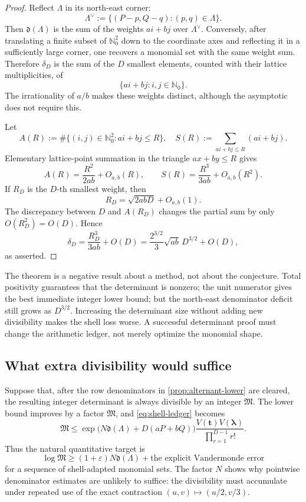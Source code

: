 \documentclass[10pt,oneside]{article}
\theoremstyle{definition}
\theoremstyle{remark}
\newcommand{\Nzero}{\mathbb N_0}
\begin{document}
\begin{proof}
Reflect \(\Lambda\) in its north-east corner:
\[
 \Lambda^\vee:=\{(P-p,Q-q):(p,q)\in\Lambda\}.
\]
Then \(\mathfrak d(\Lambda)\) is the sum of the weights \(ai+bj\) over \(\Lambda^\vee\).  Conversely, after translating a finite subset of \(\Nzero^2\) down to the coordinate axes and reflecting it in a sufficiently large corner, one recovers a monomial set with the same weight sum.  Therefore \(\delta_D\) is the sum of the \(D\) smallest elements, counted with their lattice multiplicities, of
\[
 \{ai+bj:i,j\in\Nzero\}.
\]
The irrationality of \(a/b\) makes these weights distinct, although the asymptotic does not require this.

Let
\[
 A(R):=\#\{(i,j)\in\Nzero^2:ai+bj\le R\},
 \quad
 S(R):=\sum_{ai+bj\le R}(ai+bj).
\]
Elementary lattice-point summation in the triangle \(ax+by\le R\) gives
\[
 A(R)=\frac{R^2}{2ab}+O_{a,b}(R),
 \qquad
 S(R)=\frac{R^3}{3ab}+O_{a,b}(R^2).
\]
If \(R_D\) is the \(D\)-th smallest weight, then
\[
 R_D=\sqrt{2abD}+O_{a,b}(1).
\]
The discrepancy between \(D\) and \(A(R_D)\) changes the partial sum by only \(O(R_D^2)=O(D)\).  Hence
\[
 \delta_D
 =\frac{R_D^3}{3ab}+O(D)
 =\frac{2^{3/2}}3\sqrt{ab}\,D^{3/2}+O(D),
\]
as asserted.
\end{proof}

\begin{cautionbox}
The theorem is a negative result about a method, not about the conjecture.  Total positivity guarantees that the determinant is nonzero; the unit numerator gives the best immediate integer lower bound; but the north-east denominator deficit still grows as \(D^{3/2}\).  Increasing the determinant size without adding new divisibility makes the shell loss worse.  A successful determinant proof must change the arithmetic ledger, not merely optimize the monomial shape.
\end{cautionbox}

\subsection{What extra divisibility would suffice}
Suppose that, after the row denominators in \cref{prop:alternant-lower} are cleared, the resulting integer determinant is always divisible by an integer \(\mathfrak M\).  The lower bound improves by a factor \(\mathfrak M\), and \eqref{eq:shell-ledger} becomes
\[
 \mathfrak M\le
 \exp\!\bigl(N\mathfrak d(\Lambda)+D(aP+bQ)\bigr)
 \frac{V(\bm t)V(\bm\lambda)}{\prod_{r=1}^{D-1}r!}.
\]
Thus the natural quantitative target is
\begin{equation}
 \log\mathfrak M
 \ge (1+\varepsilon)N\mathfrak d(\Lambda)
      +\text{the explicit Vandermonde error}
\label{eq:needed-divisibility}
\end{equation}
for a sequence of shell-adapted monomial sets.  The factor \(N\) shows why pointwise denominator estimates are unlikely to suffice: the divisibility must accumulate under repeated use of the exact contraction \((u,v)\mapsto(u/2,v/3)\).
\end{document}
